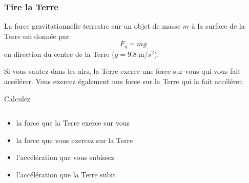\documentclass{beamer}
\begin{document}
\begin{frame}
  \frametitle{Tire la Terre}

  La force gravitationnelle terrestre sur un objet de masse $m$ à la surface
  de la Terre est donnée par
  \[
    F_g = mg
  \]
  en direction du centre de la Terre ($g = \SI{9.8}{\meter/s^2}$).

  Si vous sautez dans les airs, la Terre exerce une force sur vous qui vous
  fait accélérer.  Vous exercez également une force sur la Terre qui la fait
  accélérer.

  Calculez
  \begin{columns}
    \begin{column}{0.65\textwidth}
      \begin{itemize}
        \item la force que la Terre exerce sur vous
        \item la force que vous exercez sur la Terre
        \item l'accélération que vous subissez
        \item l'accélération que la Terre subit
      \end{itemize}
    \end{column}
    \begin{column}{0.5\textwidth}
    \end{column}
  \end{columns}
\end{frame}
\end{document}
